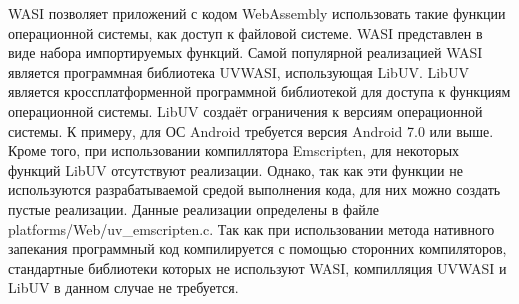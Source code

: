 WASI позволяет приложений с кодом WebAssembly использовать такие функции операционной системы, как доступ к файловой системе.
WASI представлен в виде набора импортируемых функций.
Самой популярной реализацией WASI является программная библиотека UVWASI, использующая LibUV.
LibUV является кроссплатформенной программной библиотекой для доступа к функциям операционной системы.
LibUV создаёт ограничения к версиям операционной системы. 
К примеру, для ОС Android требуется версия Android 7.0 или выше.
Кроме того, при использовании компиллятора Emscripten, для некоторых функций LibUV отсутствуют реализации.
Однако, так как эти функции не используются разрабатываемой средой выполнения кода, для них можно создать пустые реализации.
Данные реализации определены в файле platforms/Web/uv\_emscripten.c.
Так как при использовании метода нативного запекания программный код компилируется с помощью сторонних компиляторов, стандартные библиотеки которых не используют WASI, компилляция UVWASI и LibUV в данном случае не требуется.
